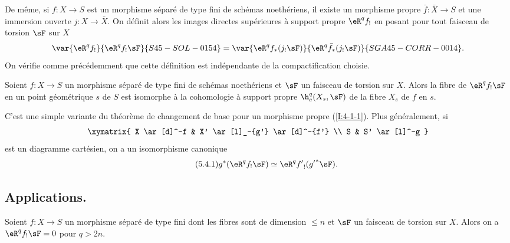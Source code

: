 \subsubsection{}\label{I:4-5-3}

De même, si $f:X\to S$ est un morphisme séparé de type fini de schémas 
noethériens, il existe un morphisme propre $\bar f:\bar X\to S$ et une 
immersion ouverte $j:X\to \bar X$. On définit alors les images directes
supérieures à support propre $\eR^q f_!$ en posant pour tout faisceau de 
torsion $\sF$ sur $X$
\[
  \var{\eR^q f_!}{\eR^q f_! \sF}{S45-SOL-0154} = \var{\eR^q f_*(j_! \sF)}{\eR^q \bar f_*(j_! \sF)}{SGA45-CORR-0014} \text{.}
\]
On vérifie comme précédemment que cette définition est indépendante de 
la compactification choisie. 





\begin{theoremdotdash}\label{I:4-5-4}
Soient $f:X\to S$ un morphisme séparé de type fini de schémas noethériens 
et $\sF$ un faisceau de torsion sur $X$. Alors la fibre de $\eR^q f_! \sF$ en un 
point géométrique $s$ de $S$ est isomorphe à la cohomologie à support 
propre $\h_c^q(X_s,\sF)$ de la fibre $X_s$ de $f$ en $s$. 
\end{theoremdotdash}

C'est une simple variante du théorème de changement de base pour un morphisme 
propre (\ref{I:4-1-1}). Plus généralement, si 
\[\xymatrix{
  X \ar[d]^-f
    & X' \ar[l]_-{g'} \ar[d]^-{f'} \\
  S 
    & S' \ar[l]^-g
}\]
est un diagramme cartésien, on a un isomorphisme canonique 
\begingroup
\makeatletter
\tagsleft@true
\let\veqno\@@leqno
\makeatother
\begin{equation*}\tag{5.4.1}\label{I:eq:4-5-4-1}
g^* (\eR^q f_! \sF) \simeq \eR^q {f'}_!({g'}^* \sF) \text{.}
\end{equation*}
\endgroup










\subsection{Applications.}\label{I:4-6}





\begin{sourcenamedfirstdotdash}\label{I:4-6-1}
Soient $f:X\to S$ un morphisme séparé de type fini dont les fibres sont de 
dimension $\leqslant n$ et $\sF$ un faisceau de torsion sur $X$. Alors on a 
$\eR^q f_! \sF = 0$ pour $q>2 n$. 
\end{sourcenamedfirstdotdash}

